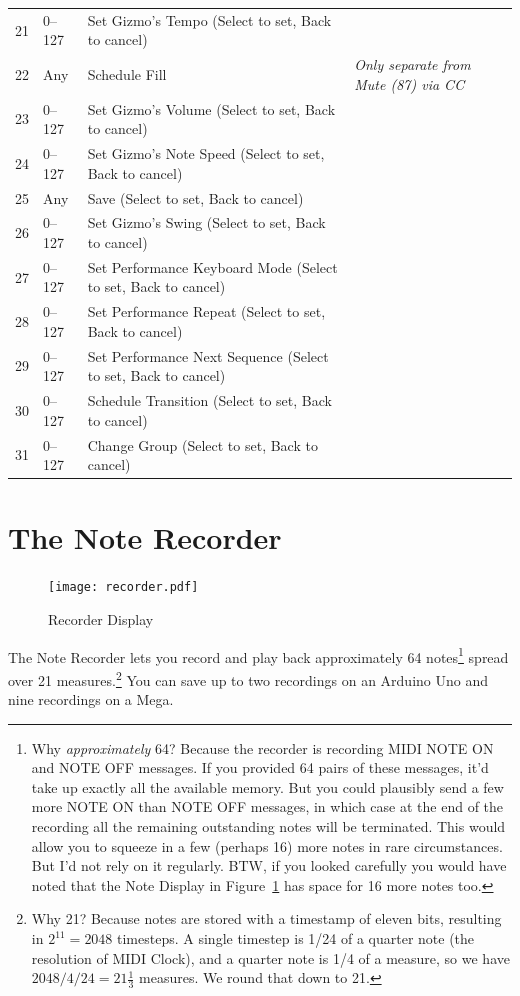 \documentclass{article}
\begin{document}
{\begin{tabular}{@{}rll@{}l@{}}
21	&	0--127		& Set Gizmo's Tempo (Select to set, Back to cancel)\\
22	&	Any		& Schedule Fill&{\it Only separate from Mute (87) via CC}\\
23	&	0--127		& Set Gizmo's Volume (Select to set, Back to cancel)\\
24	&	0--127		& Set Gizmo's Note Speed (Select to set, Back to cancel)\\
25	&	Any		& Save (Select to set, Back to cancel)\\
26	&	0--127		& Set Gizmo's Swing (Select to set, Back to cancel)\\
27	&	0--127		& Set Performance Keyboard Mode (Select to set, Back to cancel)\\
28	&	0--127		& Set Performance Repeat (Select to set, Back to cancel)\\
29	&	0--127		& Set Performance Next Sequence (Select to set, Back to cancel)\\
30	&	0--127		& Schedule Transition (Select to set, Back to cancel)\\
31	&	0--127		& Change Group (Select to set, Back to cancel)\\
\end{tabular}
}

\clearpage

\section {The Note Recorder}

\begin{figure}
\vspace{-1.5em}\texttt{[image: recorder.pdf]}
\vspace{-2em}\caption{\small Recorder Display}\vspace{-1em}
\label{recorder}
\end{figure}

The Note Recorder lets you record and play back approximately 64 notes\footnote{Why {\it approximately} 64? Because the recorder is recording MIDI NOTE ON and NOTE OFF messages.  If you provided 64 pairs of these messages, it'd take up exactly all the available memory.  But you could plausibly send a few more NOTE ON than NOTE OFF messages, in which case at the end of the recording all the remaining outstanding notes will be terminated.  This would allow you to squeeze in a few (perhaps 16) more notes in rare circumstances.  But I'd not rely on it regularly.  BTW, if you looked carefully you would have noted that the Note Display in Figure~\ref{recorder} has space for 16 more notes too.} spread over 21 measures.\footnote{Why 21?  Because notes are stored with a timestamp of eleven bits, resulting in \(2^{11} = 2048\) timesteps.  A single timestep is 1/24 of a quarter note (the resolution of MIDI Clock), and a quarter note is 1/4 of a measure, so we have \(2048 / 4 / 24 = 21 \frac{1}{3}\) measures.  We round that down to 21.}  You can save up to two recordings on an Arduino Uno and nine recordings on a Mega.
\end{document}
